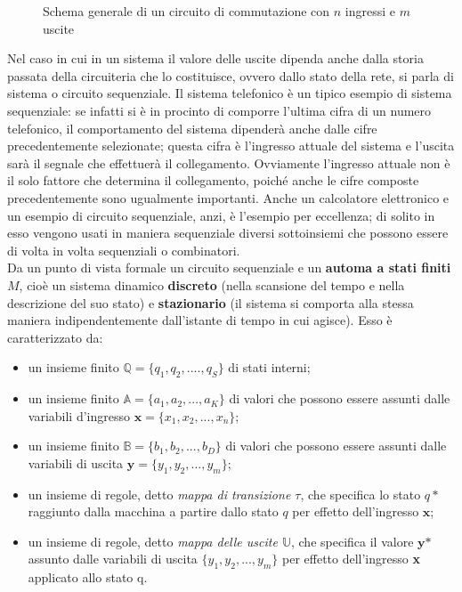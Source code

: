 \documentclass[a4paper]{extarticle}
\begin{document}
\begin{figure}[H]
    \centering
    \caption{Schema generale di un circuito di commutazione con \(n\) ingressi e \(m\) uscite}
    \label{fig:schema_circuito_commutazione}
\end{figure}

\noindent
Nel caso in cui in un sistema il valore delle uscite dipenda anche dalla storia passata della circuiteria che lo costituisce, ovvero dallo stato della rete, si parla di sistema o circuito sequenziale. Il sistema telefonico è un tipico esempio di sistema sequenziale: se infatti si è in procinto di comporre l’ultima cifra di un numero telefonico, il comportamento del sistema dipenderà anche dalle cifre precedentemente selezionate; questa cifra è l’ingresso attuale del sistema e l’uscita sarà il segnale che effettuerà il collegamento. Ovviamente l’ingresso attuale non è il solo fattore che determina il collegamento, poiché anche le cifre composte precedentemente sono ugualmente importanti. Anche un calcolatore elettronico e un esempio di circuito sequenziale, anzi, è l’esempio per eccellenza; di solito in esso vengono usati in maniera sequenziale diversi sottoinsiemi che possono essere di volta in volta sequenziali o combinatori.\\
Da un punto di vista formale un circuito sequenziale e un \textbf{automa a stati finiti} \(M\), cioè un sistema dinamico \textbf{discreto} (nella scansione del tempo e nella descrizione del suo stato) e \textbf{stazionario} (il sistema si comporta alla stessa maniera indipendentemente dall’istante di tempo in cui agisce). Esso è caratterizzato da:
\begin{itemize}
    \item un insieme finito \(\mathbb{Q} = \{q_1, q_2, ...., q_S\}\) di stati interni;
    \item un insieme finito \(\mathbb{A} = \{a_1, a_2, ..., a_K\}\) di valori che possono essere assunti dalle variabili d’ingresso \(\textbf{x} = \{x_1, x_2, ..., x_n\}\);
    \item un insieme finito \(\mathbb{B} = \{b_1, b_2, ..., b_D\}\) di valori che possono essere assunti dalle variabili di uscita \(\textbf{y} = \{y_1, y_2, ..., y_m\}\);
    \item un insieme di regole, detto \textit{mappa di transizione \(\tau\)}, che specifica lo stato \(q*\) raggiunto dalla macchina a partire dallo stato \(q\) per effetto dell’ingresso \(\textbf{x}\);
    \item un insieme di regole, detto \textit{mappa delle uscite \(\mathbb{U}\)}, che specifica il valore \(\textbf{y*}\) assunto dalle variabili di uscita \(\{y_1, y_2, ..., y_m\}\) per effetto dell'ingresso \textbf{x} applicato allo stato q.
\end{itemize}
\end{document}
